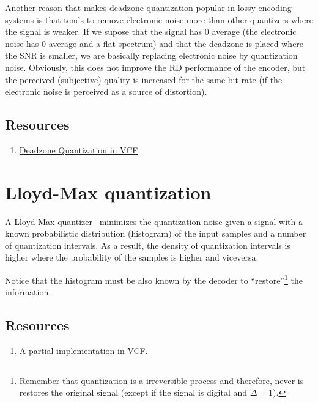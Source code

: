 Another reason that makes deadzone quantization popular in lossy
encoding systems is that tends to remove electronic noise more than
other quantizers where the signal is weaker. If we supose that the
signal has 0 average (the electronic noise has 0 average and a flat
spectrum) and that the deadzone is placed where the SNR is smaller, we
are basically replacing electronic noise by quantization
noise. Obviously, this does not improve the RD performance of the
encoder, but the perceived (subjective) quality is increased for the
same bit-rate (if the electronic noise is perceived as a source of
distortion).

\subsection*{Resources}
\begin{enumerate}
\item
  \href{https://github.com/Sistemas-Multimedia/VCF/blob/main/src/deadzone.py}{Deadzone
    Quantization in VCF}.
\end{enumerate}

\section{Lloyd-Max quantization}

A Lloyd-Max quantizer~\cite{vruiz__scalar_quantization} minimizes the
quantization noise given a signal with a known probabilistic
distribution (histogram) of the input samples and a number of
quantization intervals. As a result, the density of quantization
intervals is higher where the probability of the samples is higher and
viceversa.

Notice that the histogram must be also known by the decoder to
``restore''\footnote{Remember that quantization is a irreversible
process and therefore, never is restores the original signal (except
if the signal is digital and $\Delta=1$).} the information.

\subsection*{Resources}

\begin{enumerate}
\item
  \href{https://github.com/Sistemas-Multimedia/VCF/blob/main/src/LloydMax.py}{A
    partial implementation in VCF}.
\end{enumerate}

